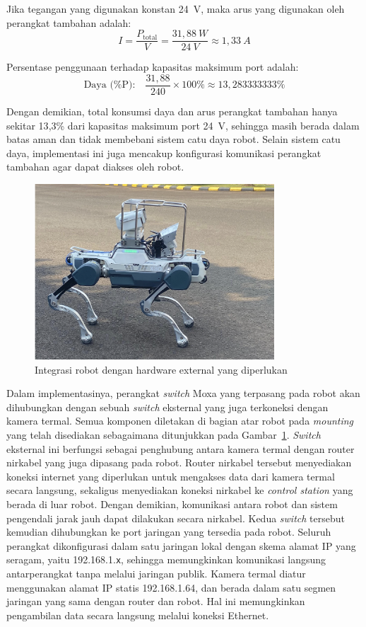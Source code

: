 Jika tegangan yang digunakan konstan 24~V, maka arus yang digunakan oleh perangkat tambahan adalah:
\[
I = \frac{P_{\text{total}}}{V} = \frac{31{,}88~W}{24~V} \approx 1{,}33~A
\]

Persentase penggunaan terhadap kapasitas maksimum port adalah:
\[
\text{Daya (\%P):} \quad \frac{31{,}88}{240} \times 100\% \approx 13{,}283333333\%
\]

Dengan demikian, total konsumsi daya dan arus perangkat tambahan hanya sekitar 13{,}3\% dari kapasitas maksimum port 24~V, sehingga masih berada dalam batas aman dan tidak membebani sistem catu daya robot. Selain sistem catu daya, implementasi ini juga mencakup konfigurasi komunikasi perangkat tambahan agar dapat diakses oleh robot.  
\begin{figure}[H]
  \centering
  \includegraphics[width=0.8\textwidth]{gambar/bab3/impl-elec2.png}
  \caption{Integrasi robot dengan hardware external yang diperlukan}
  \label{fig:sistem-elec-robot}
\end{figure}

Dalam implementasinya, perangkat \emph{switch} Moxa yang terpasang pada robot akan dihubungkan dengan sebuah \emph{switch} eksternal yang juga terkoneksi dengan kamera termal. Semua komponen diletakan di bagian atar robot pada \emph{mounting} yang telah disediakan sebagaimana ditunjukkan pada Gambar~\ref{fig:sistem-elec-robot}. \emph{Switch} eksternal ini berfungsi sebagai penghubung antara kamera termal dengan router nirkabel yang juga dipasang pada robot. Router nirkabel tersebut menyediakan koneksi internet yang diperlukan untuk mengakses data dari kamera termal secara langsung, sekaligus menyediakan koneksi nirkabel ke \emph{control station} yang berada di luar robot. Dengan demikian, komunikasi antara robot dan sistem pengendali jarak jauh dapat dilakukan secara nirkabel. Kedua \emph{switch} tersebut kemudian dihubungkan ke port jaringan yang tersedia pada robot. Seluruh perangkat dikonfigurasi dalam satu jaringan lokal dengan skema alamat IP yang seragam, yaitu 192.168.1.\texttt{x}, sehingga memungkinkan komunikasi langsung antarperangkat tanpa melalui jaringan publik. Kamera termal diatur menggunakan alamat IP statis 192.168.1.64, dan berada dalam satu segmen jaringan yang sama dengan router dan robot. Hal ini memungkinkan pengambilan data secara langsung melalui koneksi Ethernet. 



